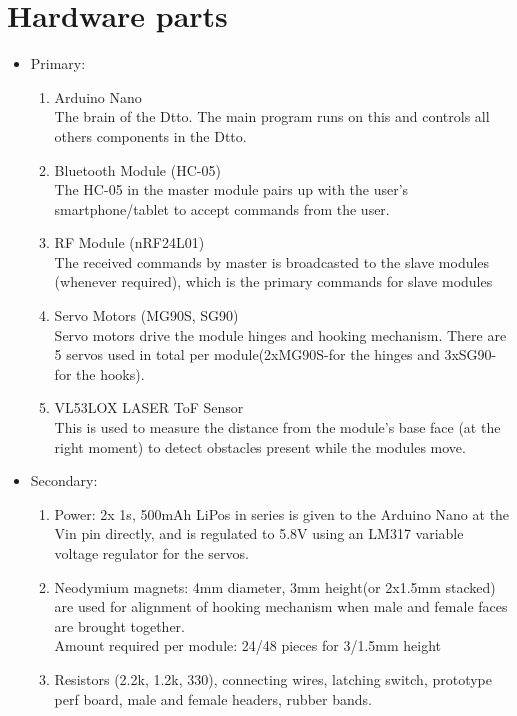 \documentclass[a4paper,12pt,oneside]{book}
\begin{document}
\section{Hardware parts}
\begin{itemize}
\item Primary:
      \begin{enumerate}
          \item Arduino Nano
          \\The brain of the Dtto. The main program runs on this and controls all others components in the Dtto.

          \item Bluetooth Module (HC-05)
          \\The HC-05 in the master module pairs up with the user's smartphone/tablet to accept commands from the user.

          \item RF Module (nRF24L01)
          \\The received commands by master is broadcasted to the slave modules (whenever required), which is the primary commands for slave modules

          \item Servo Motors (MG90S, SG90)
          \\Servo motors drive the module hinges and hooking mechanism. There are 5 servos used in total per module(2xMG90S-for the hinges and 3xSG90-for the hooks).

          \item VL53LOX LASER ToF Sensor 
          \\This is used to measure the distance from the module's base face (at the right moment) to detect obstacles present while the modules move.

      \end{enumerate}
      
\item Secondary:
      \begin{enumerate}
          \item Power: 2x 1s, 500mAh LiPos in series is given to the Arduino Nano at the Vin pin directly, and is regulated to 5.8V using an LM317 variable voltage regulator for the servos.

          \item Neodymium magnets: 4mm diameter, 3mm height(or 2x1.5mm stacked) are used for alignment of hooking mechanism when male and female faces are brought together. \\
          Amount required per module: 24/48 pieces for 3/1.5mm height

          \item Resistors (2.2k, 1.2k, 330), connecting wires, latching switch, prototype perf board, male and female headers, rubber bands.

      \end{enumerate}
\end{itemize}
\end{document}
